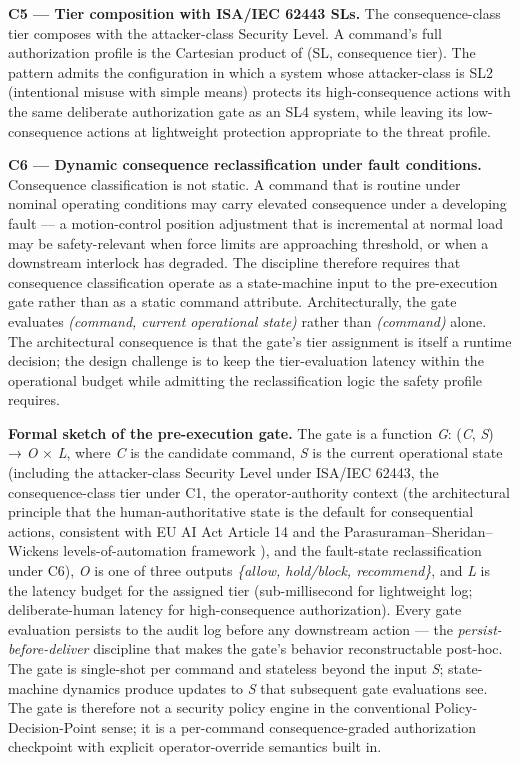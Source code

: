 \textbf{C5 --- Tier composition with ISA/IEC 62443 SLs.} The
consequence-class tier composes with the attacker-class Security Level.
A command's full authorization profile is the Cartesian product of (SL,
consequence tier). The pattern admits the configuration in which a
system whose attacker-class is SL2 (intentional misuse with simple
means) protects its high-consequence actions with the same deliberate
authorization gate as an SL4 system, while leaving its low-consequence
actions at lightweight protection appropriate to the threat profile.

\textbf{C6 --- Dynamic consequence reclassification under fault
conditions.} Consequence classification is not static. A command that is
routine under nominal operating conditions may carry elevated
consequence under a developing fault --- a motion-control position
adjustment that is incremental at normal load may be safety-relevant
when force limits are approaching threshold, or when a downstream
interlock has degraded. The discipline therefore requires that
consequence classification operate as a state-machine input to the
pre-execution gate rather than as a static command attribute.
Architecturally, the gate evaluates \emph{(command, current operational
state)} rather than \emph{(command)} alone. The architectural
consequence is that the gate's tier assignment is itself a runtime
decision; the design challenge is to keep the tier-evaluation latency
within the operational budget while admitting the reclassification logic
the safety profile requires.

\textbf{Formal sketch of the pre-execution gate.} The gate is a function
\emph{G}: (\emph{C}, \emph{S}) → \emph{O} × \emph{L}, where \emph{C} is
the candidate command, \emph{S} is the current operational state
(including the attacker-class Security Level under ISA/IEC 62443, the
consequence-class tier under C1, the operator-authority context (the
architectural principle that the human-authoritative state is the
default for consequential actions, consistent with EU AI Act Article 14
\cite{ref12} and the Parasuraman--Sheridan--Wickens levels-of-automation
framework \cite{ref13}), and the fault-state reclassification under C6),
\emph{O} is one of three outputs \emph{\{allow, hold/block,
recommend\}}, and \emph{L} is the latency budget for the assigned tier
(sub-millisecond for lightweight log; deliberate-human latency for
high-consequence authorization). Every gate evaluation persists to the
audit log before any downstream action --- the
\emph{persist-before-deliver} discipline that makes the gate's behavior
reconstructable post-hoc. The gate is single-shot per command and
stateless beyond the input \emph{S}; state-machine dynamics produce
updates to \emph{S} that subsequent gate evaluations see. The gate is
therefore not a security policy engine in the conventional
Policy-Decision-Point sense; it is a per-command consequence-graded
authorization checkpoint with explicit operator-override semantics built
in.

